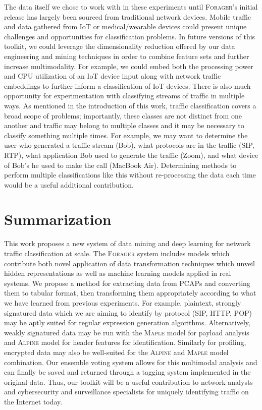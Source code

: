 The data itself we chose to work with in these experiments until \textsc{Forager}'s initial release has largely been sourced from traditional network devices. Mobile traffic and data gathered from IoT or medical/wearable devices could present unique challenges and opportunities for classification problems. In future versions of this toolkit, we could leverage the dimensionality reduction offered by our data engineering and mining techniques in order to combine feature sets and further increase multimodality. For example, we could embed both the processing power and CPU utilization of an IoT device input along with network traffic embeddings to further inform a classification of IoT devices. There is also much opportunity for experimentation with classifying streams of traffic in multiple ways. As mentioned in the introduction of this work, traffic classification covers a broad scope of problems; importantly, these classes are not distinct from one another and traffic may belong to multiple classes and it may be necessary to classify something multiple times. For example, we may want to determine the user who generated a traffic stream (Bob), what protocols are in the traffic (SIP, RTP), what application Bob used to generate the traffic (Zoom), and what device of Bob's he used to make the call (MacBook Air). Determining methods to perform multiple classifications like this without re-processing the data each time would be a useful additional contribution.

\section{Summarization}
This work proposes a new system of data mining and deep learning for network traffic classification at scale. The \textsc{Forager} system includes models which contribute both novel application of data transformation techniques which unveil hidden representations as well as machine learning models applied in real systems. We propose a method for extracting data from PCAPs and converting them to tabular format, then transforming them appropriately according to what we have learned from previous experiments. For example, plaintext, strongly signatured data which we are aiming to identify by protocol (SIP, HTTP, POP) may be aptly suited for regular expression generation algorithms. Alternatively, weakly signatured data may be run with the \textsc{Maple} model for payload analysis and \textsc{Alpine} model for header features for identification. Similarly for profiling, encrypted data may also be well-suited for the \textsc{Alpine} and \textsc{Maple} model combination. Our ensemble voting system allows for this multimodal analysis and can finally be saved and returned through a tagging system implemented in the original data. Thus, our toolkit will be a useful contribution to network analysts and cybersecurity and surveillance specialists for uniquely identifying traffic on the Internet today.
